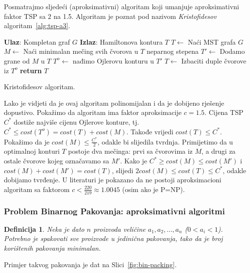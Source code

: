 \documentclass[a4paper, utf8, 11pt, colorlinks]{article}
\newtheorem{definition}{Definicija}
\begin{document}
Posmatrajmo sljedeći (aproksimativni) algoritam koji umanjuje aproksimativni faktor TSP sa $2$ na 1.5. Algoritam je poznat pod nazivom \emph{Kristofidesov} algoritam~\ref{alg:tsp-a3}.

\begin{algorithm}[!t] 

	\begin{algorithmic}[1]
		\STATE \textbf{Ulaz}: Kompletan graf $G$
		\STATE \textbf{Izlaz}: Hamiltonova kontura $T$ 
		\STATE $T \gets$ Naći MST grafa $G$
		\STATE $M \gets$ Naći minimalan mečing svih čvorova u $T$ neparnog stepena
		\STATE $T' \gets$ Dodamo grane od $M$ u $T$
		\STATE $T^o\gets$ nađimo Ojlerovu konturu u $T'$
		\STATE $T \gets$ Izbaciti duple čvorove iz $T^o$
		\STATE \textbf{return} $T$
	\end{algorithmic}	
    \caption{Kristofidesov algoritam.}
    \label{alg:tsp-a3}
\end{algorithm}
  Lako je vidjeti da je ovaj algoritam polinomijalan i da je dobijeno rješenje dopustivo.
 Pokažimo da algoritam ima faktor aproksimacije $c=1.5$.  Cijena TSP $C^*$ dostiže najviše cijenu Ojlerove konture, tj.  $C^*\leq cost(T^o) = cost(T) + cost(M)$.  Takođe vrijedi $cost(T) \leq C^*$. Pokažimo da je $cost(M) \leq  \frac{C^*}{2}$, odakle bi slijedila tvrdnja. Primijetimo da u optimalnoj konturi $T$ postoje dva mečinga: prvi sa čvorovima iz $M$, a drugi za ostale čvorove kojeg označavamo sa $M'$. 
 Kako je $C^* \geq cost(M) \leq cost(M')$ i $cost(M) + cost(M') = cost(T)$, slijedi 
 $2 cost(M) \leq cost(T) \leq C^*$, odakle dobijamo tvrđenje.  U literaturi je pokazano da ne postoji  aproksimacioni algoritam sa faktorom  $c < \frac{220}{219} \approx 1.0045$ (osim ako je P=NP). 
 
 
 \subsubsection{Problem Binarnog Pakovanja: aproksimativni algoritmi}

\begin{definition}
    Neka je dato $n$ proizvoda veličine $a_1,a_2,\ldots,a_n$ ($0<a_i<1$). Potrebno je spakovati sve proizvode u jedinična pakovanja, tako da je broj korištenih pakovanja minimalan.  
\end{definition} 

  Primjer takvog pakovanja je dat na Slici~\ref{fig:bin-packing}.
\end{document}
